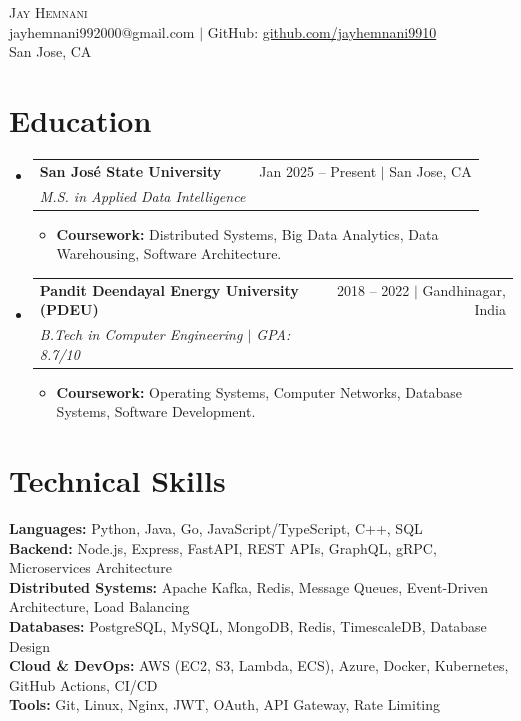 \documentclass[letterpaper,10pt]{article}
\makeatletter
\newcommand{\resumeItem}[1]{\item\small{#1 \vspace{-3pt}}}
\newcommand{\resumeSubheading}[4]{
  \vspace{-3pt}\item
    \begin{tabular*}{0.97\textwidth}[t]{l@{\extracolsep{\fill}}r}
      \textbf{#1} & #2 \\
      \textit{\small#3} & \textit{\small #4} \\
    \end{tabular*}\vspace{-8pt}
}
\newcommand{\resumeSubHeadingListStart}{\begin{itemize}[leftmargin=0.12in, label={}]}
\newcommand{\resumeSubHeadingListEnd}{\end{itemize}}
\newcommand{\resumeItemListStart}{\begin{itemize}[leftmargin=0.15in]}
\newcommand{\resumeItemListEnd}{\end{itemize}\vspace{-6pt}}
\makeatother
\begin{document}
\begin{center}
    {\Huge \scshape Jay Hemnani} \\ \vspace{2pt}
    \small jayhemnani992000@gmail.com $|$ GitHub: \href{https://github.com/jayhemnani9910}{github.com/jayhemnani9910} \\
    San Jose, CA
\end{center}

\section{Education}
  \resumeSubHeadingListStart
    \resumeSubheading
      {San Jos\'{e} State University}{Jan 2025 -- Present $|$ San Jose, CA}
      {M.S. in Applied Data Intelligence}{}
      \resumeItemListStart
        \resumeItem{\textbf{Coursework:} Distributed Systems, Big Data Analytics, Data Warehousing, Software Architecture.}
      \resumeItemListEnd
    \resumeSubheading
      {Pandit Deendayal Energy University (PDEU)}{2018 -- 2022 $|$ Gandhinagar, India}
      {B.Tech in Computer Engineering $|$ GPA: 8.7/10}{}
      \resumeItemListStart
        \resumeItem{\textbf{Coursework:} Operating Systems, Computer Networks, Database Systems, Software Development.}
      \resumeItemListEnd
  \resumeSubHeadingListEnd

\section{Technical Skills}
 \begin{itemize}[leftmargin=0.12in, label={}]
    \small{\item{
     \textbf{Languages:} Python, Java, Go, JavaScript/TypeScript, C++, SQL \\
     \textbf{Backend:} Node.js, Express, FastAPI, REST APIs, GraphQL, gRPC, Microservices Architecture \\
     \textbf{Distributed Systems:} Apache Kafka, Redis, Message Queues, Event-Driven Architecture, Load Balancing \\
     \textbf{Databases:} PostgreSQL, MySQL, MongoDB, Redis, TimescaleDB, Database Design \\
     \textbf{Cloud \& DevOps:} AWS (EC2, S3, Lambda, ECS), Azure, Docker, Kubernetes, GitHub Actions, CI/CD \\
     \textbf{Tools:} Git, Linux, Nginx, JWT, OAuth, API Gateway, Rate Limiting
    }}
 \end{itemize}
 \vspace{-8pt}
\end{document}
